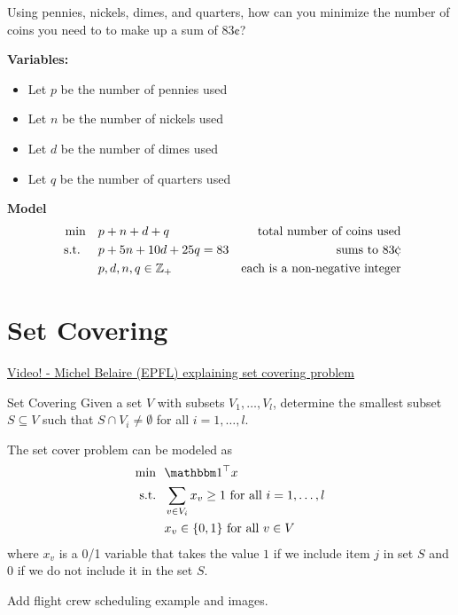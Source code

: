 \documentclass[../open-optimization/open-optimization.tex]{subfiles}
\begin{document}
\begin{example}
\label{ex:min-coins}
Using pennies, nickels, dimes, and quarters, how can you minimize the number of coins you need to to make up a sum of $83\cent$? 

\textbf{Variables:}
\begin{itemize}
\item Let $p$ be the number of pennies used
\item Let $n$ be the number of nickels used
\item Let $d$ be the number of dimes used
\item Let $q$ be the number of quarters used
\end{itemize}
\textbf{Model}
\begin{align*}
\min \quad & p + n + d + q & \text{ total number of coins used}\\
\text{ s.t. } \quad & p + 5n + 10d + 25 q = 83 & \text{sums to } 83 \cent\\
& p,d,n,q \in \Z_+ & \text{each is a non-negative integer}
\end{align*}
\end{example}
\section{Set Covering}
\href{https://www.youtube.com/watch?v=cjSeHSjPmsk}{Video! - Michel Belaire (EPFL) explaining set covering problem}
\begin{general}{Set Covering}{\npcomplete}
\label{general:set-covering}
Given a set $V$ with subsets $V_1, \dots, V_l$, determine the smallest subset $S \subseteq V$ such that 
$S \cap V_i \neq \emptyset$ for all $i=1, \dots, l$.

The set cover problem can be modeled as
\begin{equation}
\begin{split}
\min \ \ & \one^\top x\\
\text{s.t.} \ \ & \sum_{v \in V_i} x_v \geq 1 \text{ for all } i =1, \dots, l \\ 
& x_v \in \{0,1\} \text{ for all } v \in V
\end{split}
\end{equation}
where $x_v$ is a 0/1 variable that takes the value $1$ if we include item $j$ in set $S$ and $0$ if we do not include it in the set $S$.  
\end{general}

\begin{todo}
Add flight crew scheduling example and images.
\end{todo}
\end{document}
